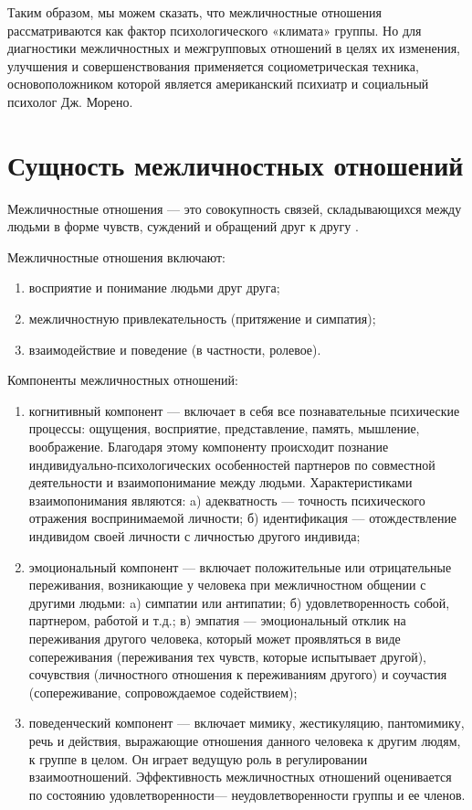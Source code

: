 Таким образом, мы можем сказать, что межличностные отношения рассматриваются как фактор психологического «климата» группы. Но для диагностики межличностных и межгрупповых отношений в целях их изменения, улучшения и совершенствования применяется социометрическая техника, основоположником которой является американский психиатр и социальный психолог Дж. Морено. 

\section{Сущность межличностных отношений}
Межличностные отношения — это совокупность связей, складывающихся между людьми в форме чувств, суждений и обращений друг к другу \cite{28}. 

Межличностные отношения включают:
\begin{enumerate}
	\item восприятие и понимание людьми друг друга;
	\item межличностную привлекательность (притяжение и симпатия);
	\item взаимодействие и поведение (в частности, ролевое).
\end{enumerate}

Компоненты межличностных отношений:

\begin{enumerate}
	\item когнитивный компонент — включает в себя все познавательные психические процессы: ощущения, восприятие, представление, память, мышление, воображение. Благодаря этому компоненту происходит познание индивидуально-психологических особенностей партнеров по совместной деятельности и взаимопонимание между людьми. Характеристиками взаимопонимания являются:
		\subitem a) адекватность — точность психического отражения воспринимаемой личности;
		\subitem б) идентификация — отождествление индивидом своей личности с личностью другого индивида;
	\item эмоциональный компонент — включает положительные или отрицательные переживания, возникающие у человека при межличностном общении с другими людьми:
		\subitem a) симпатии или антипатии;
		\subitem б) удовлетворенность собой, партнером, работой и т.д.;
		\subitem в) эмпатия — эмоциональный отклик на переживания другого человека, который может проявляться в виде сопереживания (переживания тех чувств, которые испытывает другой), сочувствия (личностного отношения к переживаниям другого) и соучастия (сопереживание, сопровождаемое содействием);
	\item поведенческий компонент — включает мимику, жестикуляцию, пантомимику, речь и действия, выражающие отношения данного человека к другим людям, к группе в целом. Он играет ведущую роль в регулировании взаимоотношений. Эффективность межличностных отношений оценивается по состоянию удовлетворенности— неудовлетворенности группы и ее членов.
\end{enumerate}


